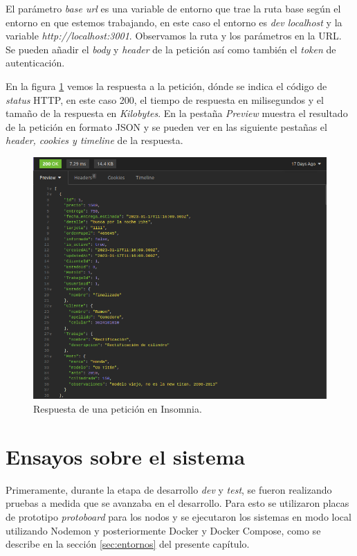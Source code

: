El parámetro \textit{base url} es una variable de entorno que trae la ruta base según el entorno en que estemos trabajando, en este caso el entorno es \textit{dev localhost} y la variable \textit{http://localhost:3001}. Observamos la ruta y los parámetros en la URL. Se pueden añadir el \textit{body} y \textit{header} de la petición así como también el \textit{token} de autenticación.

En la figura \ref{fig:insomnia-request-2} vemos la respuesta a la petición, dónde se indica el código de \textit{status} HTTP, en este caso 200, el tiempo de respuesta en milisegundos y el tamaño de la respuesta en \textit{Kilobytes}. En la pestaña \textit{Preview} muestra el resultado de la petición en formato JSON y se pueden ver en las siguiente pestañas el \textit{header, cookies y timeline} de la respuesta. 

\begin{figure}[H]
	\centering
	\includegraphics[scale=.45]{./Figures/insomnia-request-2.png}
	\caption{Respuesta de una petición en Insomnia.}
	\label{fig:insomnia-request-2}
\end{figure}


\section{Ensayos sobre el sistema}
\label{sec:ensayos-nodos}

Primeramente, durante la etapa de desarrollo \textit{dev} y \textit{test}, se fueron realizando pruebas a medida que se avanzaba en el desarrollo. Para esto se utilizaron placas de prototipo \textit{protoboard} para los nodos y se ejecutaron los sistemas en modo local utilizando Nodemon \cite{nodemon} y posteriormente Docker y Docker Compose, como se describe en la sección \ref{sec:entornos} del presente capítulo.

